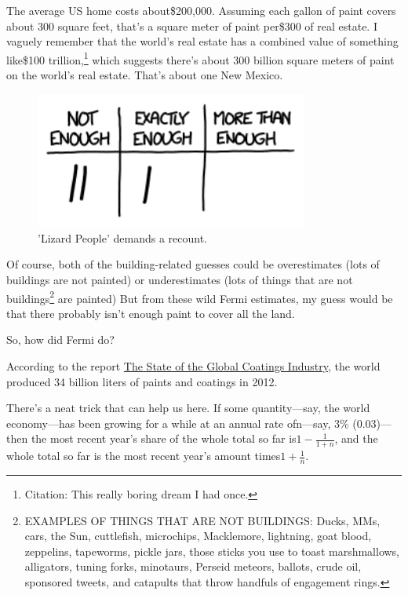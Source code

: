 {{The average US home costs about\$200,000. Assuming each gallon of paint covers about 300 square feet, that's a square meter of paint per\$300 of real estate. I vaguely remember that the world's real estate has a combined value of something like\$100 trillion,{\footnote{Citation: This really boring dream I had once.} } which suggests there's about 300 billion square meters of paint on the world's real estate. That's about one New Mexico.}

\begin{figure}[!htbp]
\centering
\includegraphics[scale=0.5, max width=0.8\textwidth]{imgs/a/84/paint_vote3.png}
\caption{'Lizard People' demands a recount.}
\end{figure}

{Of course, both of the building-related guesses could be overestimates (lots of buildings are not painted) or underestimates (lots of things that are not buildings{\footnote{EXAMPLES OF THINGS THAT ARE NOT BUILDINGS: Ducks, MMs, cars, the Sun, cuttlefish, microchips, Macklemore, lightning, goat blood, zeppelins, tapeworms, pickle jars, those sticks you use to toast marshmallows, alligators, tuning forks, minotaurs, Perseid meteors, ballots, crude oil, sponsored tweets, and catapults that throw handfuls of engagement rings.} } are painted) But from these wild Fermi estimates, my guess would be that there probably isn't enough paint to cover all the land.}

{So, how did Fermi do?}

{According to the report \href{http://www.pfonline.com/articles/the-state-of-the-global-coatings-industry}{The State of the Global Coatings Industry}, the world produced 34 billion liters of paints and coatings in 2012.}

{There's a neat trick that can help us here. If some quantity—say, the world economy—has been growing for a while at an annual rate ofn—say, 3\% (0.03)—then the most recent year's share of the whole total so far is\(1-\tfrac{1}{1+n}\), and the whole total so far is the most recent year's amount times\(1+\tfrac{1}{n}\).}

}

